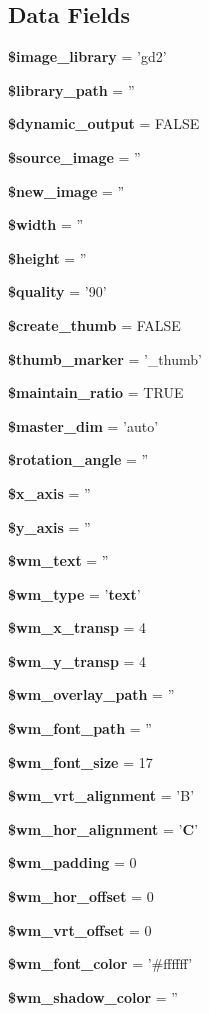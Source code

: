 \subsection*{Data Fields}
\begin{DoxyCompactItemize}
\item 
{\bf \$image\-\_\-library} = 'gd2'
\item 
{\bf \$library\-\_\-path} = ''
\item 
{\bf \$dynamic\-\_\-output} = F\-A\-L\-S\-E
\item 
{\bf \$source\-\_\-image} = ''
\item 
{\bf \$new\-\_\-image} = ''
\item 
{\bf \$width} = ''
\item 
{\bf \$height} = ''
\item 
{\bf \$quality} = '90'
\item 
{\bf \$create\-\_\-thumb} = F\-A\-L\-S\-E
\item 
{\bf \$thumb\-\_\-marker} = '\-\_\-thumb'
\item 
{\bf \$maintain\-\_\-ratio} = T\-R\-U\-E
\item 
{\bf \$master\-\_\-dim} = 'auto'
\item 
{\bf \$rotation\-\_\-angle} = ''
\item 
{\bf \$x\-\_\-axis} = ''
\item 
{\bf \$y\-\_\-axis} = ''
\item 
{\bf \$wm\-\_\-text} = ''
\item 
{\bf \$wm\-\_\-type} = '{\bf text}'
\item 
{\bf \$wm\-\_\-x\-\_\-transp} = 4
\item 
{\bf \$wm\-\_\-y\-\_\-transp} = 4
\item 
{\bf \$wm\-\_\-overlay\-\_\-path} = ''
\item 
{\bf \$wm\-\_\-font\-\_\-path} = ''
\item 
{\bf \$wm\-\_\-font\-\_\-size} = 17
\item 
{\bf \$wm\-\_\-vrt\-\_\-alignment} = 'B'
\item 
{\bf \$wm\-\_\-hor\-\_\-alignment} = '{\bf C}'
\item 
{\bf \$wm\-\_\-padding} = 0
\item 
{\bf \$wm\-\_\-hor\-\_\-offset} = 0
\item 
{\bf \$wm\-\_\-vrt\-\_\-offset} = 0
\item 
{\bf \$wm\-\_\-font\-\_\-color} = '\#ffffff'
\item 
{\bf \$wm\-\_\-shadow\-\_\-color} = ''

\end{DoxyCompactItemize}

